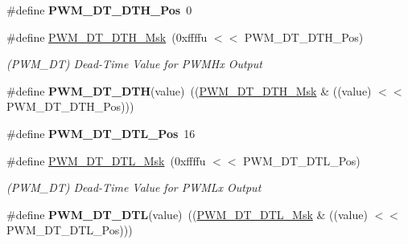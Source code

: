 \begin{DoxyCompactItemize}
\mbox{\label{group__SAMV71__PWM_gacd6342d6ab56ac200cdc15b607e006f5}} 
\#define {\bfseries P\+W\+M\+\_\+\+D\+T\+\_\+\+D\+T\+H\+\_\+\+Pos}~0
\item 
\mbox{\label{group__SAMV71__PWM_gaa2d5f3ed5aa973fb64575d526a76d299}} 
\#define \mbox{\hyperlink{group__SAMV71__PWM_gaa2d5f3ed5aa973fb64575d526a76d299}{P\+W\+M\+\_\+\+D\+T\+\_\+\+D\+T\+H\+\_\+\+Msk}}~(0xffffu $<$$<$ P\+W\+M\+\_\+\+D\+T\+\_\+\+D\+T\+H\+\_\+\+Pos)
\begin{DoxyCompactList}\small\item\em (P\+W\+M\+\_\+\+DT) Dead-\/\+Time Value for P\+W\+M\+Hx Output \end{DoxyCompactList}\item 
\mbox{\label{group__SAMV71__PWM_ga4541374ddf744a071541a6e30503c469}} 
\#define {\bfseries P\+W\+M\+\_\+\+D\+T\+\_\+\+D\+TH}(value)~((\mbox{\hyperlink{group__SAMV71__PWM_gaa2d5f3ed5aa973fb64575d526a76d299}{P\+W\+M\+\_\+\+D\+T\+\_\+\+D\+T\+H\+\_\+\+Msk}} \& ((value) $<$$<$ P\+W\+M\+\_\+\+D\+T\+\_\+\+D\+T\+H\+\_\+\+Pos)))
\item 
\mbox{\label{group__SAMV71__PWM_ga023ec46a8230cb758371e0f3e0358a30}} 
\#define {\bfseries P\+W\+M\+\_\+\+D\+T\+\_\+\+D\+T\+L\+\_\+\+Pos}~16
\item 
\mbox{\label{group__SAMV71__PWM_ga94a24dbb50ac3be38a85033a53f91b65}} 
\#define \mbox{\hyperlink{group__SAMV71__PWM_ga94a24dbb50ac3be38a85033a53f91b65}{P\+W\+M\+\_\+\+D\+T\+\_\+\+D\+T\+L\+\_\+\+Msk}}~(0xffffu $<$$<$ P\+W\+M\+\_\+\+D\+T\+\_\+\+D\+T\+L\+\_\+\+Pos)
\begin{DoxyCompactList}\small\item\em (P\+W\+M\+\_\+\+DT) Dead-\/\+Time Value for P\+W\+M\+Lx Output \end{DoxyCompactList}\item 
\mbox{\label{group__SAMV71__PWM_ga235770b0d3489660b457979691bc4ffc}} 
\#define {\bfseries P\+W\+M\+\_\+\+D\+T\+\_\+\+D\+TL}(value)~((\mbox{\hyperlink{group__SAMV71__PWM_ga94a24dbb50ac3be38a85033a53f91b65}{P\+W\+M\+\_\+\+D\+T\+\_\+\+D\+T\+L\+\_\+\+Msk}} \& ((value) $<$$<$ P\+W\+M\+\_\+\+D\+T\+\_\+\+D\+T\+L\+\_\+\+Pos)))
\item 

\end{DoxyCompactItemize}
